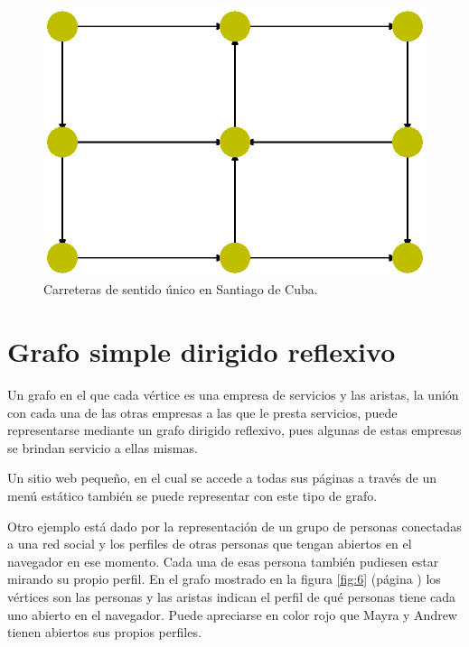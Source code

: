 \documentclass{article}
\begin{document}

\begin{figure}
  \includegraphics[width=.8\columnwidth]{5.eps}
  \vspace*{-8mm}
  \caption{Carreteras de sentido único en Santiago de Cuba.}
  \label{fig:5}
\end{figure}
\newpage

\section{Grafo simple dirigido reflexivo}

Un grafo en el que cada vértice es una empresa de servicios y las aristas, la unión con cada una de las otras empresas a las que le presta servicios, puede representarse mediante un grafo dirigido reflexivo, pues algunas de estas empresas se brindan servicio a ellas mismas. 

Un sitio web pequeño, en el cual se accede a todas sus páginas a través de un menú estático también se puede representar con este tipo de grafo. 

Otro ejemplo está dado por la representación de un grupo de personas conectadas a una red social y los perfiles de otras personas que tengan abiertos en el navegador en ese momento. Cada una de esas persona también pudiesen estar mirando su propio
perfil. En el grafo mostrado en la figura \ref{fig:6} (página \pageref{fig:6}) los vértices son las personas y las aristas indican el perfil de qué personas tiene cada uno abierto en el navegador. Puede apreciarse en color rojo que Mayra y Andrew tienen abiertos sus propios perfiles.
\end{document}
